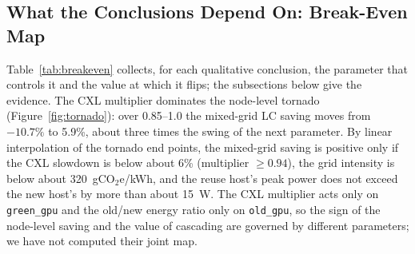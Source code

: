 \documentclass{article} %
\begin{document}
\subsection{What the Conclusions Depend On: Break-Even Map}
\label{sec:breakeven}
Table~\ref{tab:breakeven} collects, for each qualitative conclusion, the parameter that controls it and the value at which it flips; the subsections below give the evidence. The CXL multiplier dominates the node-level tornado (Figure~\ref{fig:tornado}): over 0.85--1.0 the mixed-grid LC saving moves from $-10.7\%$ to 5.9\%, about three times the swing of the next parameter. By linear interpolation of the tornado end points, the mixed-grid saving is positive only if the CXL slowdown is below about 6\% (multiplier $\geq 0.94$), the grid intensity is below about 320~gCO$_2$e/kWh, and the reuse host's peak power does not exceed the new host's by more than about 15~W. The CXL multiplier acts only on \texttt{green\_gpu} and the old/new energy ratio only on \texttt{old\_gpu}, so the sign of the node-level saving and the value of cascading are governed by different parameters; we have not computed their joint map.
\end{document}
